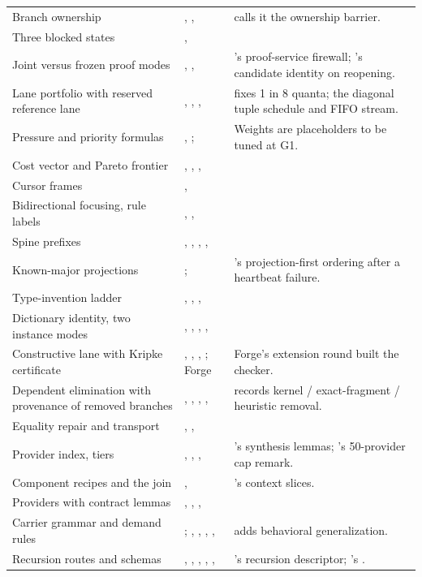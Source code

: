 {\begin{longtable}{@{}L{4.3cm}L{2.3cm}L{8.5cm}@{}}
Branch ownership & , ,  &  calls it the ownership barrier. \\
Three blocked states & ,  & \\
Joint versus frozen proof modes & , ,  & 's proof-service firewall; 's candidate identity on reopening. \\
Lane portfolio with reserved reference lane & , , ,  &  fixes 1 in 8 quanta;  the diagonal tuple schedule and FIFO stream. \\
Pressure and priority formulas & , ;  & Weights are placeholders to be tuned at G1. \\
Cost vector and Pareto frontier & , , ,  & \\
Cursor frames & ,  & \\
Bidirectional focusing, rule labels & , ,  & \\
Spine prefixes & , , , ,  & \\
Known-major projections & ;  & 's projection-first ordering after a heartbeat failure. \\
Type-invention ladder & , , ,  & \\
Dictionary identity, two instance modes & , , , ,  & \\
Constructive lane with Kripke certificate & , , , ; Forge & Forge's extension round built the checker. \\
Dependent elimination with provenance of removed branches & , , , ,  &  records kernel / exact-fragment / heuristic removal. \\
Equality repair and transport & , ,  & \\
Provider index, tiers & , , ,  & 's synthesis lemmas; 's 50-provider cap remark. \\
Component recipes and the join & ,  & 's context slices. \\
Providers with contract lemmas & , , ,  & \\
Carrier grammar and demand rules & ; , , , ,  &  adds behavioral generalization. \\
Recursion routes and schemas & , , , , ,  & 's recursion descriptor; 's . \\

\end{longtable}}
